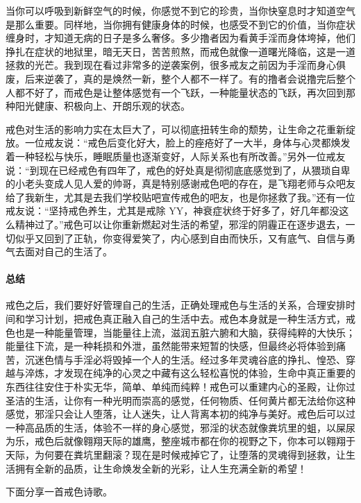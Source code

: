 当你可以呼吸到新鲜空气的时候，你感觉不到它的珍贵，当你快窒息时才知道空气是那么重要。同样地，当你拥有健康身体的时候，也感受不到它的价值，当你症状缠身时，才知道无病的日子是多么奢侈。多少撸者因为看黄手淫而身体垮掉，他们挣扎在症状的地狱里，暗无天日，苦苦煎熬，而戒色就像一道曙光降临，这是一道拯救的光芒。我到现在看过非常多的逆袭案例，很多戒友之前因为手淫而身心俱废，后来逆袭了，真的是焕然一新，整个人都不一样了。有的撸者会说撸完后整个人都不好了，而戒色是让整体感觉有一个飞跃，一种能量状态的飞跃，再次回到那种阳光健康、积极向上、开朗乐观的状态。

戒色对生活的影响力实在太巨大了，可以彻底扭转生命的颓势，让生命之花重新绽放。一位戒友说：“戒色后变化好大，脸上的痤疮好了一大半，身体与心灵都焕发着一种轻松与快乐，睡眠质量也逐渐变好，人际关系也有所改善。”另外一位戒友说：“到现在已经戒色有四年了，戒色的好处真是彻彻底底感觉到了，从猥琐自卑的小老头变成人见人爱的帅哥，真是特别感谢戒色吧的存在，是飞翔老师与众吧友给了我新生，尤其是去我们学校贴吧宣传戒色的吧友，也是你拯救了我。”还有一位戒友说：“坚持戒色养生，尤其是戒除 YY，神衰症状终于好多了，好几年都没这么精神过了。”戒色可以让你重新燃起对生活的希望，邪淫的阴霾正在逐步退去，一切似乎又回到了正轨，你变得爱笑了，内心感到自由而快乐，又有底气、自信与勇气去面对自己的生活了。

\paragraph*{总结}

戒色之后，我们要好好管理自己的生活，正确处理戒色与生活的关系，合理安排时间和学习计划，把戒色真正融入自己的生活中去。戒色本身就是一种生活方式，戒色也是一种能量管理，当能量往上流，滋润五脏六腑和大脑，获得纯粹的大快乐；能量往下流，是一种耗损和外泄，虽然能带来短暂的快感，但最终必将体验到痛苦，沉迷色情与手淫必将毁掉一个人的生活。经过多年灵魂谷底的挣扎、惶恐、穿越与淬炼，才发现在纯净的心灵之中藏有这么轻松喜悦的体验，生命中真正重要的东西往往安住于朴实无华，简单、单纯而纯粹！戒色可以重建内心的圣殿，让你过圣洁的生活，让你有一种光明而崇高的感觉，任何物质、任何黄片都无法给你这种感觉，邪淫只会让人堕落，让人迷失，让人背离本初的纯净与美好。戒色后可以过一种高品质的生活，体验不一样的身心感觉，邪淫的状态就像粪坑里的蛆，以屎尿为乐，戒色后就像翱翔天际的雄鹰，整座城市都在你的视野之下，你本可以翱翔于天际，为何要在粪坑里翻滚？现在是时候戒掉它了，让堕落的灵魂得到拯救，让生活拥有全新的品质，让生命焕发全新的光彩，让人生充满全新的希望！

下面分享一首戒色诗歌。

